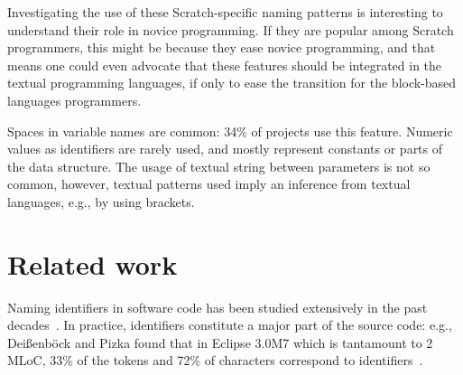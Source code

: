 \documentclass[conference]{IEEEtran}
\begin{document}
Investigating the use of these Scratch-specific naming patterns is interesting to understand their role in novice programming. If they are popular among Scratch programmers, this might be because they ease novice programming, and that means one could even advocate that these features should be integrated in the textual programming languages, if only to ease the transition for the block-based languages programmers.

\begin{framed}
 Spaces in variable names are common: 34\% of projects use this feature. 
 Numeric values as identifiers are rarely used, and mostly represent constants or parts of the data structure.
 The usage of textual string between parameters is not so common, however, textual patterns used imply an inference from textual languages, e.g., by using brackets. 
\end{framed}

\section{Related work}
Naming identifiers in software code has been studied extensively in the past decades~\cite{AmanASK15,AnquetilL98,AvidanF17,Beniamini,ButlerWYS10,CaprileT00,HofmeisterSH17,LawrieMFB07,LunguK13,ScannielloR13,TakangGM96,Teasley,TramontanaRS14}. 
In practice, identifiers constitute a major part of the source code: e.g., Dei{\ss}enb{\"o}ck and Pizka found that in Eclipse 3.0M7 which is tantamount to 2 MLoC, 33\% of the tokens and 72\% of characters correspond to identifiers~\cite{Deissenbock}. 
\end{document}
